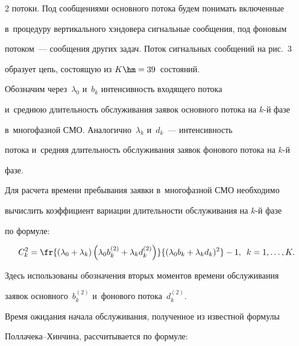 \begin{multicols}{2}
потоки. Под сообщениями основного потока будем понимать включенные 


в~процедуру вертикального хэндовера сигнальные сообщения, под фоновым 


потоком~--- сообщения других задач. Поток сигнальных сообщений на рис.~3 


образует цепь, состоящую из $K\hm=39$~со\-сто\-яний. 











  Обозначим через~$\lambda_0$ и~$b_k$ интенсивность входящего потока 


и~среднюю длительность обслу\-жи\-вания заявок основного потока на $k$-й фазе 


в~многофаз\-ной СМО. Аналогично~$\lambda_k$ и~$d_k$~--- интенсивность 


потока и~средняя длительность обслуживания заявок фонового потока на $k$-й 


фазе. 


  


  Для расчета времени пребывания заявки в~многофазной СМО необходимо 


вычислить коэффициент вариации длительности обслуживания на $k$-й фазе 


по формуле:


  \begin{equation*}


  C_k^2 =\fr{(\lambda_0+\lambda_k) \left(\lambda_0 b_k^{(2)} +\lambda_k 


d_k^{(2)}\right)} {(\lambda_0 b_k+\lambda_k d_k)^2}-1,\enskip


  k=1,\ldots, K.




  \end{equation*}


Здесь использованы обозначения вторых моментов времени обслуживания 


заявок основного~$b_k^{(2)}$ и~фонового потока~$d_k^{(2)}$.





  Время ожидания начала обслуживания, полученное из известной формулы 


Пол\-ла\-че\-ка--Хин\-чи\-на, рассчитывается по формуле:


  $$



\end{multicols}
